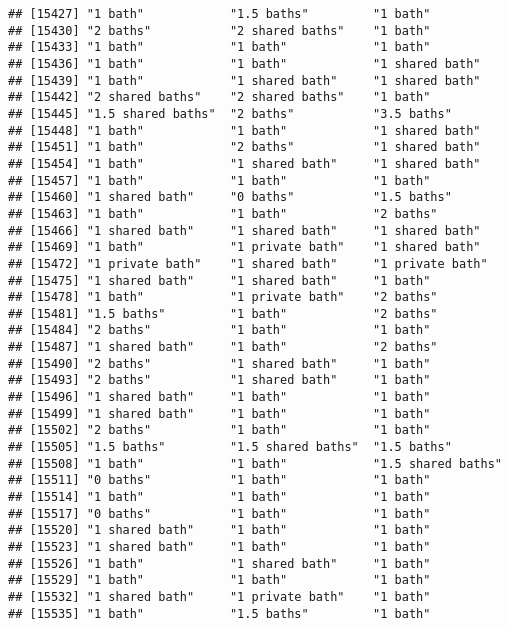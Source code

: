 \documentclass[
]{article}
\begin{document}
\begin{verbatim}
## [15427] "1 bath"            "1.5 baths"         "1 bath"           
## [15430] "2 baths"           "2 shared baths"    "1 bath"           
## [15433] "1 bath"            "1 bath"            "1 bath"           
## [15436] "1 bath"            "1 bath"            "1 shared bath"    
## [15439] "1 bath"            "1 shared bath"     "1 shared bath"    
## [15442] "2 shared baths"    "2 shared baths"    "1 bath"           
## [15445] "1.5 shared baths"  "2 baths"           "3.5 baths"        
## [15448] "1 bath"            "1 bath"            "1 shared bath"    
## [15451] "1 bath"            "2 baths"           "1 shared bath"    
## [15454] "1 bath"            "1 shared bath"     "1 shared bath"    
## [15457] "1 bath"            "1 bath"            "1 bath"           
## [15460] "1 shared bath"     "0 baths"           "1.5 baths"        
## [15463] "1 bath"            "1 bath"            "2 baths"          
## [15466] "1 shared bath"     "1 shared bath"     "1 shared bath"    
## [15469] "1 bath"            "1 private bath"    "1 shared bath"    
## [15472] "1 private bath"    "1 shared bath"     "1 private bath"   
## [15475] "1 shared bath"     "1 shared bath"     "1 bath"           
## [15478] "1 bath"            "1 private bath"    "2 baths"          
## [15481] "1.5 baths"         "1 bath"            "2 baths"          
## [15484] "2 baths"           "1 bath"            "1 bath"           
## [15487] "1 shared bath"     "1 bath"            "2 baths"          
## [15490] "2 baths"           "1 shared bath"     "1 bath"           
## [15493] "2 baths"           "1 shared bath"     "1 bath"           
## [15496] "1 shared bath"     "1 bath"            "1 bath"           
## [15499] "1 shared bath"     "1 bath"            "1 bath"           
## [15502] "2 baths"           "1 bath"            "1 bath"           
## [15505] "1.5 baths"         "1.5 shared baths"  "1.5 baths"        
## [15508] "1 bath"            "1 bath"            "1.5 shared baths" 
## [15511] "0 baths"           "1 bath"            "1 bath"           
## [15514] "1 bath"            "1 bath"            "1 bath"           
## [15517] "0 baths"           "1 bath"            "1 bath"           
## [15520] "1 shared bath"     "1 bath"            "1 bath"           
## [15523] "1 shared bath"     "1 bath"            "1 bath"           
## [15526] "1 bath"            "1 shared bath"     "1 bath"           
## [15529] "1 bath"            "1 bath"            "1 bath"           
## [15532] "1 shared bath"     "1 private bath"    "1 bath"           
## [15535] "1 bath"            "1.5 baths"         "1 bath"           

\end{verbatim}
\end{document}

